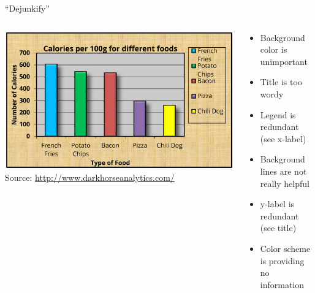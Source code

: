 \documentclass[aspectratio=169]{../latex_main/tntbeamer}  %
\begin{document}
	\begin{frame}{``Dejunkify''}

        \begin{columns}
            \begin{column}{0.5\textwidth}
            
                \includegraphics[width=1\textwidth]{04_visualization/figure/bad_figure.png}        
                {
                \footnotesize
                Source: \url{http://www.darkhorseanalytics.com/}
                }
            \end{column}
        
            \begin{column}{0.5\textwidth}
            
            \begin{itemize}
                \item Background color is unimportant
                \item Title is too wordy
                \item Legend is redundant (see x-label)
                \item Background lines are not really helpful
                \item y-label is redundant (see title)
                \item Color scheme is providing no information
            \end{itemize}
            
            \end{column}
            
        \end{columns}
	    
	\end{frame}
	
\end{document}
